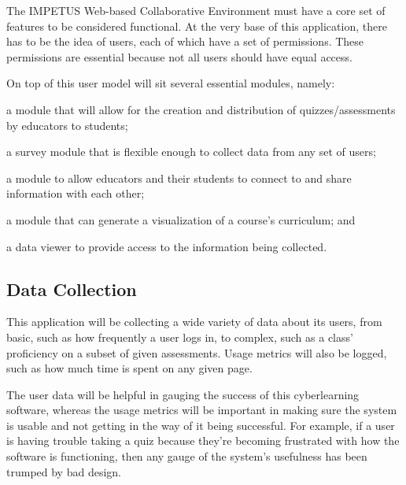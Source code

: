 \documentclass[11pt,letterpaper]{article}
\begin{document}
\begin{doublespacing}

The IMPETUS Web-based Collaborative Environment must have a core set of features to be considered functional. At the very base of this application, there has to be the idea of users, each of which have a set of permissions. These permissions are essential because not all users should have equal access.

On top of this user model will sit several essential modules, namely: 
\begin{inparaenum}[\itshape 1\upshape)]
\item a module that will allow for the creation and distribution of quizzes/assessments by educators to students;
\item a survey module that is flexible enough to collect data from any set of users;
\item a module to allow educators and their students to connect to and share information with each other;
\item a module that can generate a visualization of a course's curriculum; and
\item a data viewer to provide access to the information being collected.
\end{inparaenum}

\end{doublespacing}

\subsection{Data Collection}

\begin{doublespacing}

This application will be collecting a wide variety of data about its users, from basic, such as how frequently a user logs in, to complex, such as a class' proficiency on a subset of given assessments. Usage metrics will also be logged, such as how much time is spent on any given page.

The user data will be helpful in gauging the success of this cyberlearning software, whereas the usage metrics will be important in making sure the system is usable and not getting in the way of it being successful. For example, if a user is having trouble taking a quiz because they're becoming frustrated with how the software is functioning, then any gauge of the system's usefulness has been trumped by bad design.

\end{doublespacing}
\end{document}
